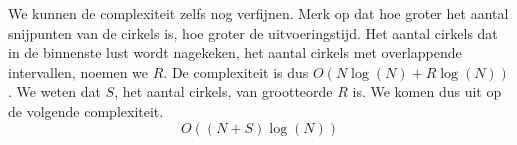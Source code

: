 We kunnen de complexiteit zelfs nog verfijnen. Merk op dat hoe groter
het aantal snijpunten van de cirkels is, hoe groter de uitvoeringstijd. Het aantal cirkels dat in de binnenste lust wordt nagekeken, het aantal cirkels met overlappende intervallen, noemen we $R$. De complexiteit is dus $O(N\log(N) + R\log(N))$. We weten dat $S$, het aantal cirkels, van grootteorde $R$ is. We komen dus uit op de volgende complexiteit.
\[
O((N+S)\log(N))
\]

